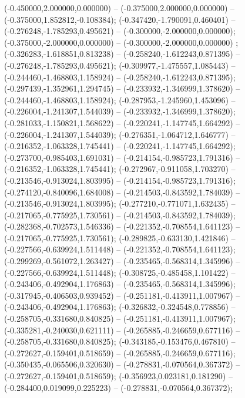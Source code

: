  (-0.450000,2.000000,0.000000) -- (-0.375000,2.000000,0.000000) -- (-0.375000,1.852812,-0.108384);
 (-0.347420,-1.790091,0.460401) -- (-0.276248,-1.785293,0.495621) -- (-0.300000,-2.000000,0.000000);
 (-0.375000,-2.000000,0.000000) -- (-0.300000,-2.000000,0.000000) ;
 (-0.326283,-1.618851,0.813238) -- (-0.258240,-1.612243,0.871395) -- (-0.276248,-1.785293,0.495621);
 (-0.309977,-1.475557,1.085443) -- (-0.244460,-1.468803,1.158924) -- (-0.258240,-1.612243,0.871395);
 (-0.297439,-1.352961,1.294745) -- (-0.233932,-1.346999,1.378620) -- (-0.244460,-1.468803,1.158924);
 (-0.287953,-1.245960,1.453096) -- (-0.226004,-1.241307,1.544039) -- (-0.233932,-1.346999,1.378620);
 (-0.281033,-1.150821,1.568622) -- (-0.220241,-1.147745,1.664292) -- (-0.226004,-1.241307,1.544039);
 (-0.276351,-1.064712,1.646777) -- (-0.216352,-1.063328,1.745441) -- (-0.220241,-1.147745,1.664292);
 (-0.273700,-0.985403,1.691031) -- (-0.214154,-0.985723,1.791316) -- (-0.216352,-1.063328,1.745441);
 (-0.272967,-0.911058,1.703270) -- (-0.213546,-0.913024,1.803995) -- (-0.214154,-0.985723,1.791316);
 (-0.274120,-0.840096,1.684008) -- (-0.214503,-0.843592,1.784039) -- (-0.213546,-0.913024,1.803995);
 (-0.277210,-0.771071,1.632435) -- (-0.217065,-0.775925,1.730561) -- (-0.214503,-0.843592,1.784039);
 (-0.282368,-0.702573,1.546336) -- (-0.221352,-0.708554,1.641123) -- (-0.217065,-0.775925,1.730561);
 (-0.289825,-0.633130,1.421846) -- (-0.227566,-0.639924,1.511448) -- (-0.221352,-0.708554,1.641123);
 (-0.299269,-0.561072,1.263427) -- (-0.235465,-0.568314,1.345996) -- (-0.227566,-0.639924,1.511448);
 (-0.308725,-0.485458,1.101422) -- (-0.243406,-0.492904,1.176863) -- (-0.235465,-0.568314,1.345996);
 (-0.317945,-0.406503,0.939452) -- (-0.251181,-0.413911,1.007967) -- (-0.243406,-0.492904,1.176863);
 (-0.326832,-0.324548,0.778856) -- (-0.258705,-0.331680,0.840825) -- (-0.251181,-0.413911,1.007967);
 (-0.335281,-0.240030,0.621111) -- (-0.265885,-0.246659,0.677116) -- (-0.258705,-0.331680,0.840825);
 (-0.343185,-0.153476,0.467810) -- (-0.272627,-0.159401,0.518659) -- (-0.265885,-0.246659,0.677116);
 (-0.350435,-0.065506,0.320630) -- (-0.278831,-0.070564,0.367372) -- (-0.272627,-0.159401,0.518659);
 (-0.356923,0.023181,0.181290) -- (-0.284400,0.019099,0.225223) -- (-0.278831,-0.070564,0.367372);
